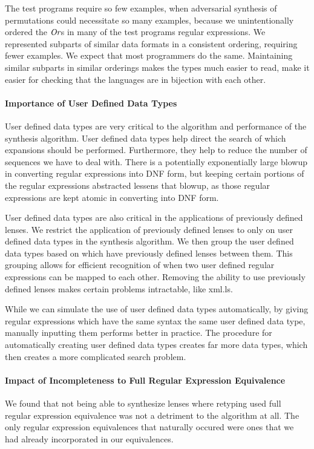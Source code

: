 \documentclass[numbers,10pt,preprint\ifanon ,nocopyrightspace\fi]{sigplanconf}
\begin{document}
The test programs require
so few examples, when adversarial synthesis of permutations could necessitate so
many examples, because we unintentionally ordered the $\textit{Or}$s in many of
the test programs regular expressions.
We represented subparts of similar data formats in a consistent ordering,
requiring fewer examples.  We expect that most programmers do the same.
Maintaining similar subparts in similar orderings makes the types much easier to
read, make it easier for checking that the languages are in bijection with each
other.

\paragraph*{Importance of User Defined Data Types}

User defined data types are very critical to the algorithm and performance of
the synthesis algorithm.  User defined data types help direct the search of
which expansions should be performed.  Furthermore, they help to reduce the
number of sequences we have to deal with.  There is a potentially exponentially
large blowup in converting regular expressions into DNF form, but keeping
certain portions of the regular expressions abstracted lessens that blowup,
as those regular expressions are kept atomic in converting into DNF form.

User defined data types are also critical in the applications of previously
defined lenses.  We restrict the application of previously defined lenses to
only on user defined data types in the synthesis algorithm.  We then group the
user defined data types based on which have previously defined lenses between
them.  This grouping allows for efficient recognition of when two user defined regular
expressions can be mapped to each other.  Removing the ability to use previously
defined lenses makes certain problems intractable, like xml.ls.

While we can simulate the use of user defined data types automatically, by
giving regular expressions which have the same syntax the same user defined data
type, manually inputting them performs better in practice.  The
procedure for automatically creating user defined data types creates far more
data types, which then creates a more complicated search problem.

\paragraph*{Impact of Incompleteness to Full Regular Expression Equivalence}
We found that not being able to synthesize lenses where retyping used full
regular expression equivalence was not a detriment to the algorithm at all.  The
only regular expression equivalences that naturally occured were ones that we
had already incorporated in our equivalences.
\end{document}
